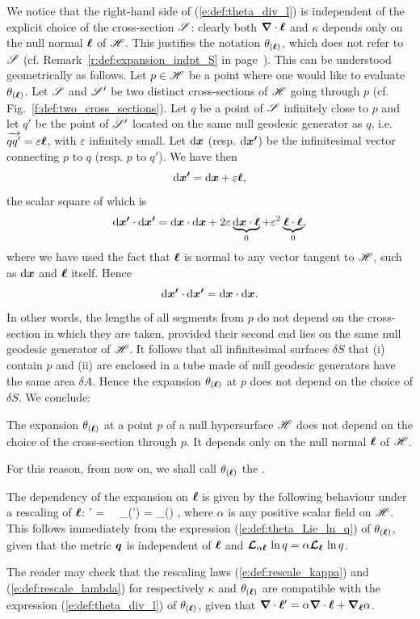 {We notice that the right-hand side of (\ref{e:def:theta_div_l}) is independent of the
explicit choice of the cross-section $\mathscr{S}$: clearly both $\bm{\nabla}\cdot\bm{\ell}$
and $\kappa$ depends only on the null normal $\bm{\ell}$ of $\mathscr{H}$. This justifies
the notation $\theta_{(\bm{\ell})}$, which does not refer to $\mathscr{S}$
(cf. Remark~\ref{r:def:expansion_indpt_S} in page~\pageref{r:def:expansion_indpt_S}).
This can be understood geometrically as follows. Let $p\in\mathscr{H}$ be a
point where one would like to evaluate $\theta_{(\bm{\ell})}$. Let $\mathscr{S}$ and $\mathscr{S}'$
be two distinct cross-sections of $\mathscr{H}$ going through $p$
(cf. Fig.~\ref{f:def:two_cross_sections}). Let $q$ be a point of $\mathscr{S}$ infinitely close to $p$ and let $q'$
be the point of $\mathscr{S}'$ located on the same null geodesic generator as $q$,
i.e. $\overrightarrow{qq'} = \varepsilon \bm{\ell}$, with $\varepsilon$ infinitely small.
Let $\mathrm{d}\bm{x}$ (resp. $\mathrm{d}\bm{x'}$) be the infinitesimal vector connecting
$p$ to $q$ (resp. $p$ to $q'$). We have then
\[
\mathrm{d}\bm{x'} = \mathrm{d}\bm{x} + \varepsilon \bm{\ell} ,
\]
the scalar square of which is
\[
    \mathrm{d}\bm{x'}\cdot\mathrm{d}\bm{x'} =\mathrm{d}\bm{x}\cdot\mathrm{d}\bm{x}
            + 2 \varepsilon \underbrace{\mathrm{d}\bm{x}\cdot \bm{\ell}}_{0}
            + \varepsilon^2 \underbrace{\bm{\ell}\cdot \bm{\ell}}_{0},
\]
where we have used the fact that $\bm{\ell}$ is normal to any vector tangent to $\mathscr{H}$,
such as $\mathrm{d}\bm{x}$ and $\bm{\ell}$ itself. Hence
\[
    \mathrm{d}\bm{x'}\cdot\mathrm{d}\bm{x'} = \mathrm{d}\bm{x}\cdot\mathrm{d}\bm{x} .
\]
In other words, the lengths of all segments from $p$ do not depend
on the cross-section in which they are taken, provided their second end
lies on the same null geodesic generator of $\mathscr{H}$. It follows that all infinitesimal surfaces
$\delta S$ that (i) contain $p$ and (ii) are enclosed in a tube made of null geodesic generators have the same
area $\delta A$. Hence the expansion $\theta_{(\bm{\ell})}$ at $p$
does not depend on the choice of $\delta S$.
We conclude:
\begin{prop}
The expansion $\theta_{(\bm{\ell})}$ at a point $p$ of a null hypersurface $\mathscr{H}$
does not depend on the choice of the cross-section through $p$.
It depends  only on the null normal $\bm{\ell}$ of $\mathscr{H}$.
\end{prop}
For this reason, from now on, we shall call $\theta_{(\bm{\ell})}$
the .

The dependency of the expansion on $\bm{\ell}$ is given by the following
behaviour under a rescaling of $\bm{\ell}$:
\be \label{e:def:rescale_lambda}
   \wl' = \alpha \wl \ \Longrightarrow \ \theta_{(\wl')} = \alpha \theta_{(\wl)} ,
\ee
where $\alpha$ is any positive scalar field on $\mathscr{H}$. This follows immediately
from the expression (\ref{e:def:theta_Lie_ln_q}) of $\theta_{(\bm{\ell})}$, given
that the metric $\bm{q}$ is independent of $\bm{\ell}$ and
$\bm{\mathcal{L}}_{\alpha\bm{\ell}}\,\ln q = \alpha \bm{\mathcal{L}}_{\bm{\bm{\ell}}}\,\ln q$.
\begin{remark}
The reader may check that the rescaling laws (\ref{e:def:rescale_kappa})
and (\ref{e:def:rescale_lambda}) for respectively $\kappa$ and $\theta_{(\bm{\ell})}$
are compatible with the expression (\ref{e:def:theta_div_l}) of $\theta_{(\bm{\ell})}$,
given that $\bm{\nabla}\cdot \bm{\ell}' = \alpha\bm{\nabla}\cdot\bm{\ell} + \bm{\nabla}_{\bm{\ell}} \alpha$.
\end{remark}

}
